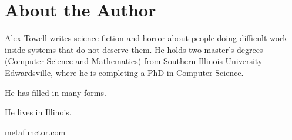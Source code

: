 
\chapter*{About the Author}

Alex Towell writes science fiction and horror about people doing difficult work inside systems that do not deserve them. He holds two master's degrees (Computer Science and Mathematics) from Southern Illinois University Edwardsville, where he is completing a PhD in Computer Science.

He has filled in many forms.

He lives in Illinois.

\vspace{1em}
\noindent metafunctor.com
